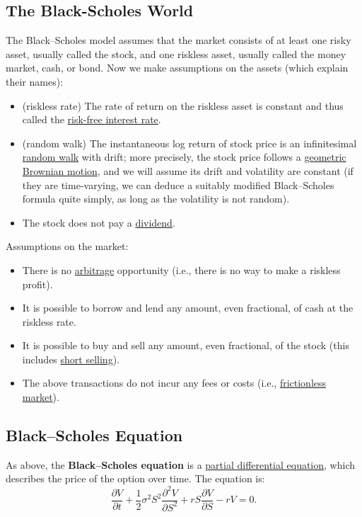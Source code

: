 \subsection{The Black-Scholes World}
The Black–Scholes model assumes that the market consists of at least one risky asset, usually called the stock, and one riskless asset, usually called the money market, cash, or bond. Now we make assumptions on the assets (which explain their names):
\begin{itemize}
    \item (riskless rate) The rate of return on the riskless asset is constant and thus called the \href{https://en.wikipedia.org/wiki/Risk-free_interest_rate}{risk-free interest rate}.
    \item (random walk) The instantaneous log return of stock price is an infinitesimal \href{https://en.wikipedia.org/wiki/Random_walk}{random walk} with drift; more precisely, the stock price follows a \href{https://en.wikipedia.org/wiki/Geometric_Brownian_motion}{geometric Brownian motion}, and we will assume its drift and volatility are constant (if they are time-varying, we can deduce a suitably modified Black–Scholes formula quite simply, as long as the volatility is not random).
    \item The stock does not pay a \href{https://en.wikipedia.org/wiki/Dividend}{dividend}.
\end{itemize}

Assumptions on the market:
\begin{itemize}
    \item There is no \href{https://en.wikipedia.org/wiki/Arbitrage}{arbitrage} opportunity (i.e., there is no way to make a riskless profit).
    \item It is possible to borrow and lend any amount, even fractional, of cash at the riskless rate.
    \item It is possible to buy and sell any amount, even fractional, of the stock (this includes \href{https://en.wikipedia.org/wiki/Short_selling}{short selling}).
    \item The above transactions do not incur any fees or costs (i.e., \href{https://en.wikipedia.org/wiki/Frictionless_market}{frictionless market}).
\end{itemize}


\subsection{Black–Scholes Equation}
As above, the \textbf{Black–Scholes equation} is a \href{https://en.wikipedia.org/wiki/Partial_differential_equation}{partial differential equation}, which describes the price of the option over time. The equation is:
\begin{equation}\label{F:black-scholes}
    \frac{\partial V}{\partial t} + \frac{1}{2}\sigma^2S^2\frac{\partial^2V}{\partial S^2} + rS\frac{\partial V}{\partial S} - rV = 0.
\end{equation}


